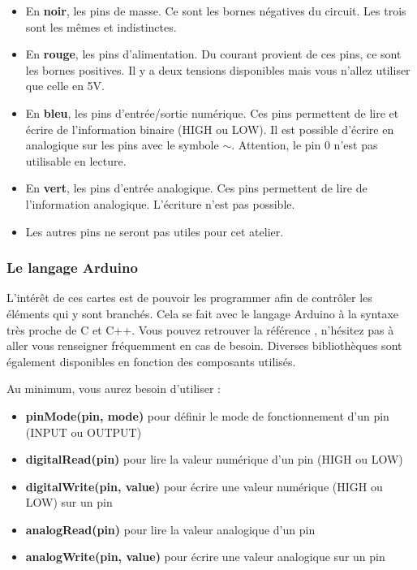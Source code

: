 
\begin{itemize}
	\item En \textbf{noir}, les pins de masse.
		  Ce sont les bornes négatives du circuit.
		  Les trois sont les mêmes et indistinctes.
	\item En \textbf{rouge}, les pins d'alimentation.
		  Du courant provient de ces pins, ce sont les bornes positives.
		  Il y a deux tensions disponibles mais vous n'allez utiliser que celle en 5V.
	\item En \textbf{bleu}, les pins d'entrée/sortie numérique.
		  Ces pins permettent de lire et écrire de l'information binaire (HIGH ou LOW).
		  Il est possible d'écrire en analogique sur les pins avec le symbole \boldmath$\sim$.
		  Attention, le pin 0 n'est pas utilisable en lecture.
	\item En \textbf{vert}, les pins d'entrée analogique.
		  Ces pins permettent de lire de l'information analogique.
		  L'écriture n'est pas possible.
	\item Les autres pins ne seront pas utiles pour cet atelier.
\end{itemize}

\subsubsection{Le langage Arduino}

L'intérêt de ces cartes est de pouvoir les programmer afin de contrôler les éléments qui y sont branchés.
Cela se fait avec le langage Arduino à la syntaxe très proche de C et C++.
Vous pouvez retrouver la référence , n'hésitez pas à aller vous renseigner fréquemment en cas de besoin.
Diverses bibliothèques sont également disponibles en fonction des composants utilisés.

\br
Au minimum, vous aurez besoin d'utiliser :
\begin{itemize}
	\item \textbf{pinMode(pin, mode)} pour définir le mode de fonctionnement d'un pin (INPUT ou OUTPUT)
	\item \textbf{digitalRead(pin)} pour lire la valeur numérique d'un pin (HIGH ou LOW)
	\item \textbf{digitalWrite(pin, value)} pour écrire une valeur numérique (HIGH ou LOW) sur un pin
	\item \textbf{analogRead(pin)} pour lire la valeur analogique d'un pin
	\item \textbf{analogWrite(pin, value)} pour écrire une valeur analogique sur un pin	
\end{itemize}


